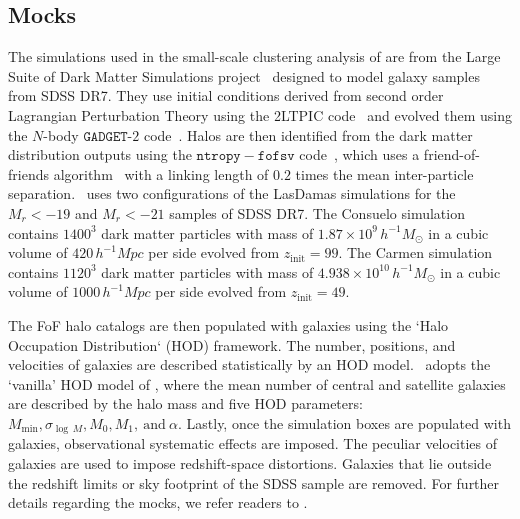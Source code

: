 \documentclass[12pt, letterpaper, preprint]{aastex}
\newcommand{\Sinh}{\citetalias{sinha2017}}
\begin{document}
\subsection{\cite{sinha2017} Mocks} \label{sec:gmf} 
The simulations used in the small-scale clustering analysis of \cite{sinha2017} 
are from the Large Suite of Dark Matter Simulations project~\citep[LasDamas;][]{mcbride2009} 
designed to model galaxy samples from SDSS DR7. They use initial conditions derived from 
second order Lagrangian Perturbation Theory using the 2LTPIC code~\citep{scoccimarro1998, crocce2006}
and evolved them using the $N$-body $\mathtt{GADGET}$-$2$ code~\citep{springel2005}.
Halos are then identified from the dark matter distribution outputs using 
the $\mathtt{ntropy-fofsv}$ code~\citep{gardner2007}, which uses a 
friend-of-friends algorithm~\citep[FoF;][]{davis1985} with a linking length of $0.2$
times the mean inter-particle separation. %
\Sinh~uses two configurations of the LasDamas simulations for the 
$M_r < -19$ and $M_r < -21$ samples of SDSS DR7.
The Consuelo simulation contains $1400^3$ dark matter particles with 
mass of $1.87 \times 10^9\,h^{-1} M_\odot$ in a cubic volume of 
$420\,h^{-1} Mpc$ per side evolved from $z_\mathrm{init} = 99$. 
The Carmen simulation contains $1120^3$ dark matter particles with mass 
of $4.938 \times 10^{10}\,h^{-1} M_\odot$ in a cubic volume of 
$1000\,h^{-1} Mpc$ per side evolved from $z_\mathrm{init} = 49$. 

The FoF halo catalogs are then populated with galaxies using the 
`Halo Occupation Distribution` (HOD) framework. The 
number, positions, and velocities of galaxies are described statistically 
by an HOD model. \Sinh~adopts the `vanilla' HOD model of \cite{zheng2007}, 
where the mean number of central and satellite galaxies are described by 
the halo mass and five HOD parameters: $M_\mathrm{min}, 
\sigma_{\log\,M} , M_0, M_1,~\mathrm{and}~\alpha$. Lastly, once the 
simulation boxes are populated with galaxies, observational systematic 
effects are imposed. The peculiar velocities of galaxies are used to 
impose redshift-space distortions. Galaxies that lie outside the redshift
limits or sky footprint of the SDSS sample are removed. For further 
details regarding the mocks, we refer readers to \Sinh.
\end{document}
